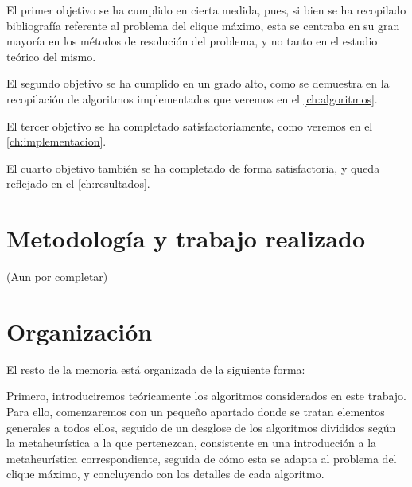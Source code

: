 El primer objetivo se ha cumplido en cierta medida, pues, si bien se ha recopilado
bibliografía referente al problema del clique máximo, esta se centraba en su gran
mayoría en los métodos de resolución del problema, y no tanto en el estudio teórico
del mismo.

El segundo objetivo se ha cumplido en un grado alto, como se demuestra en la recopilación
de algoritmos implementados que veremos en el \autoref{ch:algoritmos}.

El tercer objetivo se ha completado satisfactoriamente, como veremos en el \autoref{ch:implementacion}.

El cuarto objetivo también se ha completado de forma satisfactoria, y queda
reflejado en el \autoref{ch:resultados}.

\section{Metodología y trabajo realizado}

(Aun por completar)




\section{Organización}

El resto de la memoria está organizada de la siguiente forma:

Primero, introduciremos teóricamente los algoritmos considerados en este trabajo.
Para ello, comenzaremos con un pequeño apartado donde se tratan elementos generales a
todos ellos, seguido de un desglose de los algoritmos divididos según la metaheurística
a la que pertenezcan, consistente en una introducción a la metaheurística correspondiente,
seguida de cómo esta se adapta al problema del clique máximo, y concluyendo con los
detalles de cada algoritmo.

